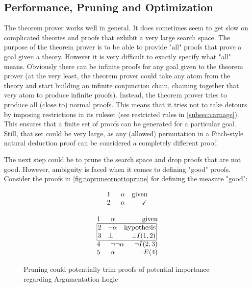 \documentclass[11pt,twoside,a4paper]{report}
\begin{document}
\subsection{Performance, Pruning and Optimization}
The theorem prover works well in general. It does sometimes seem to get slow on complicated theories and proofs that exhibit a very large search space. The purpose of the theorem prover is to be able to provide "all" proofs that prove a goal given a theory. However it is very difficult to exactly specify what "all" means. Obviously there can be infinite proofs for any goal given to the theorem prover (at the very least, the theorem prover could take any atom from the theory and start building an infinite conjunction chain, chaining together that very atom to produce infinite proofs). Instead, the theorem prover tries to produce all (close to) normal proofs. This means that it tries not to take detours by imposing restrictions in its ruleset (see restricted rules in \autoref{subsec:carnage}). This ensures that a finite set of proofs can be generated for a particular goal. Still, that set could be very large, as any (allowed) permutation in a Fitch-style natural deduction proof can be considered a completely different proof. 

The next step could be to prune the search space and drop proofs that are not good. However, ambiguity is faced when it comes to defining "good" proofs. Consider the proofs in \autoref{fig:topruneornottoprune} for defining the measure "good":

\begin{figure}[htp]
\begin{minipage}[c]{.5\linewidth}
\[\vbox{\offinterlineskip\halign{
&\tabskip=1.5em#\strut&$#$\hfil\tabskip=1em&\hfil$#$\tabskip=0em\cr
%
1&\alpha&\mbox{given}\cr
2&\alpha&\checkmark\cr
}}\]
\end{minipage}%
\begin{minipage}[c]{.5\linewidth}
\[\vbox{\offinterlineskip\halign{
&\tabskip=1.5em#\strut&$#$\hfil\tabskip=1em&\hfil$#$\tabskip=0em\cr
%
1&\alpha&\mbox{given}\cr
%
\multispan3\vbox{\halign{
\vrule#&&\hskip.1em\tabskip=1em#\strut&$#$\hfil\tabskip=1em&\hfil$#$\hskip0.1em\tabskip=0em&\vrule#\cr
\noalign{\hrule}
%
&2&\neg\alpha&\mbox{hypothesis}&\cr
&3&\bot&\bot I(1,2)&\cr
%
\noalign{\hrule}}}\,\cr
%
4&\neg\neg\alpha&\neg I(2,3)\cr
5&\alpha&\neg E(4)\cr
}}\]
\end{minipage}

\caption{Pruning could potentially trim proofs of potential importance regarding Argumentation Logic\label{fig:topruneornottoprune}}
\end{figure}
\end{document}
